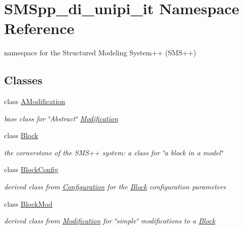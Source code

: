 \hypertarget{namespace_s_m_spp__di__unipi__it}{}\section{S\+M\+Spp\+\_\+di\+\_\+unipi\+\_\+it Namespace Reference}
\label{namespace_s_m_spp__di__unipi__it}


namespace for the Structured Modeling System++ (S\+M\+S++)  


\subsection*{Classes}
\begin{DoxyCompactItemize}
\item 
class \mbox{\hyperlink{class_s_m_spp__di__unipi__it_1_1_a_modification}{A\+Modification}}
\begin{DoxyCompactList}\small\item\em base class for \char`\"{}\+Abstract\char`\"{} \mbox{\hyperlink{class_s_m_spp__di__unipi__it_1_1_modification}{Modification}} \end{DoxyCompactList}\item 
class \mbox{\hyperlink{class_s_m_spp__di__unipi__it_1_1_block}{Block}}
\begin{DoxyCompactList}\small\item\em the cornerstone of the S\+M\+S++ system\+: a class for \char`\"{}a block in a model\char`\"{} \end{DoxyCompactList}\item 
class \mbox{\hyperlink{class_s_m_spp__di__unipi__it_1_1_block_config}{Block\+Config}}
\begin{DoxyCompactList}\small\item\em derived class from \mbox{\hyperlink{class_s_m_spp__di__unipi__it_1_1_configuration}{Configuration}} for the \mbox{\hyperlink{class_s_m_spp__di__unipi__it_1_1_block}{Block}} configuration parameters \end{DoxyCompactList}\item 
class \mbox{\hyperlink{class_s_m_spp__di__unipi__it_1_1_block_mod}{Block\+Mod}}
\begin{DoxyCompactList}\small\item\em derived class from \mbox{\hyperlink{class_s_m_spp__di__unipi__it_1_1_modification}{Modification}} for \char`\"{}simple\char`\"{} modifications to a \mbox{\hyperlink{class_s_m_spp__di__unipi__it_1_1_block}{Block}} \end{DoxyCompactList}\item 

\end{DoxyCompactItemize}
